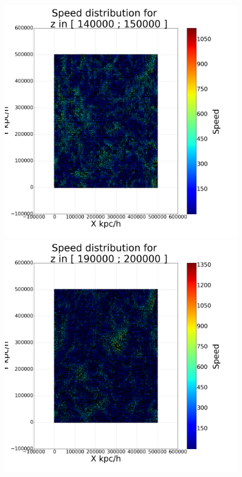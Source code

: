 \documentclass[12pt]{article}
\begin{document}
\begin{figure}[ht]
\begin{minipage}{.45\textwidth}
\end{minipage}
\begin{minipage}{.45\textwidth}
  \centering
  \includegraphics[width=0.9\textwidth]{graphs/scatter_magnitud_vel150000.png}
\end{minipage}
\begin{minipage}{.45\textwidth}
  \centering
  \includegraphics[width=0.9\textwidth]{graphs/scatter_magnitud_vel200000.png}

\end{minipage}
\end{figure}
\end{document}

